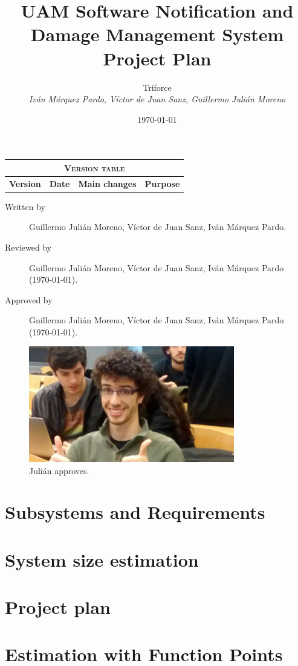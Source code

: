 \documentclass[11pt]{report}
\title{UAM Software Notification and Damage Management System \\ Project Plan}
\date{\today}
\author{{\Large Triforce} \\ \vspace{5pt} \textit{Iván Márquez Pardo, Víctor de Juan Sanz, Guillermo Julián Moreno}}
\begin{document}
\maketitle

\begin{table}[hbtp]
\centering
\begin{tabular}{|c|c|p{3cm}|p{3.5cm}|}
\hline \multicolumn{4}{|c|}{\textsc{Version table}} \\ \hline \hline
\textbf{Version} & \textbf{Date} & \textbf{Main changes} & \textbf{Purpose} \\ \hline
\end{tabular}
\end{table}

\begin{description}
\item[Written by] Guillermo Julián Moreno, Víctor de Juan Sanz, Iván Márquez Pardo.
\item[Reviewed by] Guillermo Julián Moreno, Víctor de Juan Sanz, Iván Márquez Pardo (\today).
\item[Approved by] Guillermo Julián Moreno, Víctor de Juan Sanz, Iván Márquez Pardo (\today).
\end{description}

\begin{figure}[hbtp]
\centering
\includegraphics[width=0.8\textwidth]{../Yo.jpg}
\caption{Julián approves.}
\end{figure}


\newpage

\begin{abstract}
\end{abstract}

\tableofcontents
\newpage
\pagestyle{plain}

\chapter{Subsystems and Requirements}



\chapter{System size estimation}


\chapter{Project plan}


\appendix

\chapter{Estimation with Function Points}
\label{chapFunctionPoints}

\end{document}
